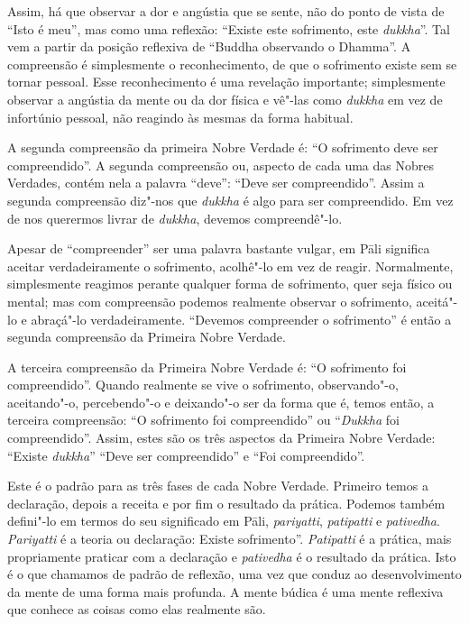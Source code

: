 Assim, há que observar a dor e angústia que se sente, não do ponto de vista de
“Isto é meu”, mas como uma reflexão: “Existe este sofrimento, este
\emph{dukkha}”. Tal vem a partir da posição reflexiva de “Buddha observando o
Dhamma”. A compreensão é simplesmente o reconhecimento, de que o sofrimento existe
sem se tornar pessoal. Esse reconhecimento é uma revelação importante;
simplesmente observar a angústia da mente ou da dor física e vê"-las como
\emph{dukkha} em vez de infortúnio pessoal, não reagindo às mesmas da forma
habitual.

A segunda compreensão da primeira Nobre Verdade é: “O sofrimento deve ser
compreendido”. A segunda compreensão ou, aspecto de cada uma das Nobres Verdades,
contém nela a \mbox{palavra} “deve”: “Deve ser compreendido”. Assim a segunda compreensão
diz"-nos que \emph{dukkha} é algo para ser compreendido. Em vez de nos querermos livrar
de \emph{dukkha}, devemos \mbox{compreendê"-lo}.

Apesar de “compreender” ser uma palavra bastante vulgar, em Pāli significa
aceitar verdadeiramente o sofrimento, acolhê"-lo em vez de reagir. Normalmente, 
simplesmente reagimos perante qualquer forma de sofrimento, quer seja físico ou mental; 
mas com compreensão podemos realmente observar o sofrimento, aceitá"-lo e abraçá"-lo
verdadeiramente. “Devemos compreender o sofrimento” é então a segunda compreensão
da Primeira Nobre Verdade.

A terceira compreensão da Primeira Nobre Verdade é: “O sofrimento foi
compreendido”. Quando realmente se vive o sofrimento, observando"-o, aceitando"-o,
percebendo"-o e deixando"-o ser da forma que é, temos então, a terceira compreensão:
“O sofrimento foi compreendido” ou “\emph{Dukkha} foi compreendido”. Assim,
estes são os três aspectos da Primeira Nobre Verdade: “Existe \emph{dukkha}”
“Deve ser compreendido” e “Foi compreendido”.

\sectionBreak

Este é o padrão para as três fases de cada Nobre Verdade. Primeiro temos a
declaração, depois a receita e por fim o resultado da prática. Podemos também
defini"-lo em termos do seu significado em Pāli, \emph{pariyatti},
\emph{patipatti} e \emph{pativedha}. \emph{Pariyatti} é a teoria ou declaração:
Existe sofrimento”. \emph{Patipatti} é a prática, mais propriamente praticar com
a declaração e \emph{pativedha} é o resultado da prática. Isto é o que chamamos
de padrão de reflexão, uma vez que conduz ao desenvolvimento da mente de uma
forma mais profunda. A mente búdica é uma mente reflexiva que conhece as coisas
como elas realmente são.

